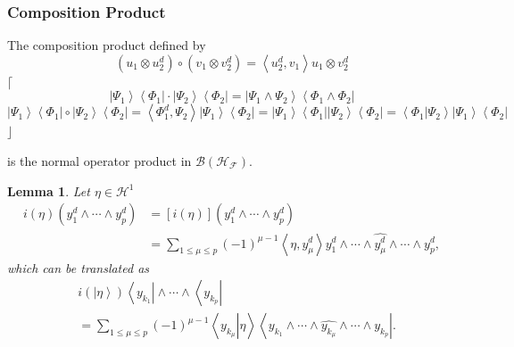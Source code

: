 \documentclass[aps,preprint]{revtex4}%
\newtheorem{lemma}[theorem]{Lemma}
\begin{document}
\subsubsection{Composition Product}

The composition product defined by
\begin{equation}
\left(  u_{1}\otimes u_{2}^{d}\right)  \circ\left(  v_{1}\otimes v_{2}%
^{d}\right)  =\left\langle u_{2}^{d},v_{1}\right\rangle u_{1}\otimes v_{2}^{d}%
\end{equation}
$\lceil$%
\begin{equation}
\left\vert \Psi_{1}\right\rangle \left\langle \Phi_{1}\right\vert
\cdot\left\vert \Psi_{2}\right\rangle \left\langle \Phi_{2}\right\vert
=\left\vert \Psi_{1}\wedge\Psi_{2}\right\rangle \left\langle \Phi_{1}%
\wedge\Phi_{2}\right\vert
\end{equation}%
\begin{equation}
\left\vert \Psi_{1}\right\rangle \left\langle \Phi_{1}\right\vert
\circ\left\vert \Psi_{2}\right\rangle \left\langle \Phi_{2}\right\vert
=\left\langle \Phi_{1}^{d},\Psi_{2}\right\rangle \left\vert \Psi
_{1}\right\rangle \left\langle \Phi_{2}\right\vert =\left\vert \Psi
_{1}\right\rangle \left\langle \Phi_{1}\right\vert \left\vert \Psi
_{2}\right\rangle \left\langle \Phi_{2}\right\vert =\left\langle \left.
\Phi_{1}\right\vert \Psi_{2}\right\rangle \left\vert \Psi_{1}\right\rangle
\left\langle \Phi_{2}\right\vert
\end{equation}
$\rfloor$

is the normal operator product in $\mathcal{B}\left(  \mathcal{H}%
_{\mathcal{F}}\right)  .$

\begin{lemma}
Let $\eta\in\mathcal{H}^{1}$
\begin{align}
i\left(  \eta\right)  \left(  y_{1}^{d}\wedge\cdots\wedge y_{p}^{d}\right)
&  =\left[  i\left(  \eta\right)  \right]  \left(  y_{1}^{d}\wedge\cdots\wedge
y_{p}^{d}\right) \\
&  =\sum_{1\leq\mu\leq p}\left(  -1\right)  ^{\mu-1}\left\langle \eta,y_{\mu
}^{d}\right\rangle y_{1}^{d}\wedge\cdots\wedge\widehat{y_{\mu}^{d}}%
\wedge\cdots\wedge y_{p}^{d},
\end{align}
which can be translated as
\begin{align}
&  i\left(  \left\vert \eta\right\rangle \right)  \left\langle y_{k_{1}%
}\right\vert \wedge\cdots\wedge\left\langle y_{k_{p}}\right\vert \\
&  =\sum_{1\leq\mu\leq p}\left(  -1\right)  ^{\mu-1}\left\langle \left.
y_{k_{\mu}}\right\vert \eta\right\rangle \left\langle y_{k_{1}}\wedge
\cdots\wedge\widehat{y_{k_{\mu}}}\wedge\cdots\wedge y_{k_{p}}\right\vert .
\end{align}

\end{lemma}
\end{document}
